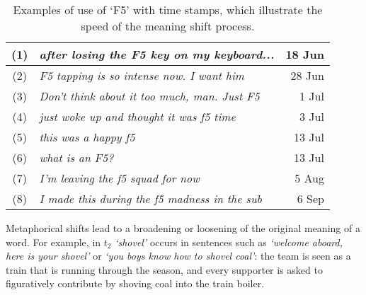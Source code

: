 \begin{table}[t]\centering   \small
    \begin{tabular}{@{}cp{5.5cm}r@{}}
        \hline
        (1) & \em after losing the F5 key on my keyboard... & 18 Jun\\\hline
        (2) & \em F5 tapping is so intense now. I want him & 28 Jun\\\hline
        (3) & \em Don't think about it too much, man. Just F5 & 1 Jul\\\hline
        (4) & \em just woke up and thought it was f5 time & 3 Jul\\\hline
        (5) & \em this was a happy f5 & 13 Jul\\\hline
        (6) & \em what is an F5? & 13 Jul \\\hline
        (7) & \em I'm leaving the f5 squad for now & 5 Aug\\\hline
        (8) & \em I made this during the f5 madness in the sub & 6 Sep\\\hline      
    \end{tabular}
    \vspace*{-0.2cm}
    \caption{Examples of use of `F5' with time stamps, which illustrate the speed of the meaning shift process.}
    \vspace*{-0.2cm}
     \label{table:f5}
\end{table}


Metaphorical shifts lead to a broadening or loosening of the original meaning of a word. For example, in $t_2$ {\em `shovel'}  occurs in sentences such as \textit{`welcome aboard, here is your shovel'} or 
\textit{`you boys know how to shovel coal'}: the team is seen as a train that is running through the season, and every supporter is asked to figuratively contribute by shoving coal into the train boiler. 


